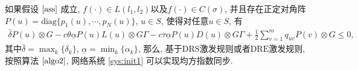         \begin{thm}\label{thm:qn}
            如果假设 $\ref{ass}$ 成立, $f(\cdot)\in L(l_{1},l_{2})$以及$f(\cdot)\in C(\sigma)$, 并且存在正定对角阵$P(u)=\mathrm{diag}\{p_1(u),\cdots,p_N(u)\}$, $u\in S$, 使得对任意$u\in S$, 有
            \begin{align*}
            \bar{\delta}P(u)\otimes G-c\theta\underline{\alpha} P(u)L(u)\otimes G\Gamma
            -c\tau\underline{\alpha} P(u)D(u)\otimes G\Gamma+\frac{1}{2}\sum_{v=1}^{m}q_{uv}P(v)\otimes G\leq 0,
            \end{align*}
            其中$\bar{\delta}=\max_{k}\{\delta_k \}$, $\underline{\alpha}=\min_{k}\{\alpha_{k}\}$,
            那么, 基于$\mathrm{DRS}$激发规则或者$\mathrm{DRE}$激发规则, 按照算法 $\ref{algo2}$, 网络系统 \eqref{sys:init1} 可以实现均方指数同步.
        \end{thm}
